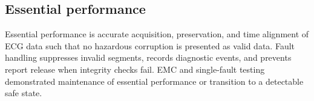 \subsection{Essential performance}
Essential performance is accurate acquisition, preservation, and time alignment of ECG data such that no hazardous corruption is presented as valid data. Fault handling suppresses invalid segments, records diagnostic events, and prevents report release when integrity checks fail. EMC and single-fault testing demonstrated maintenance of essential performance or transition to a detectable safe state.

